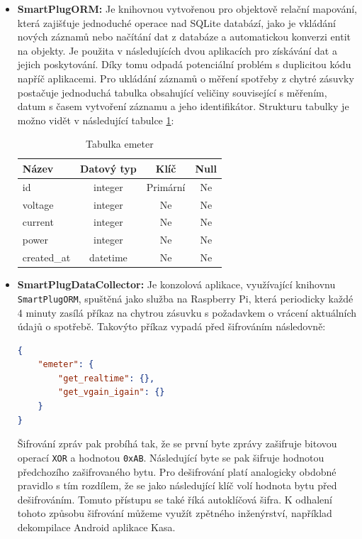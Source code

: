 \documentclass[czech,master,dept460,male,cpp,cpdeclaration,oneside]{diploma}
\begin{document}
\begin{itemize}
\item \textbf{SmartPlugORM:}
Je knihovnou vytvořenou pro objektově relační mapování\autocite{PofEAA}, která zajišťuje jednoduché operace nad SQLite databází, jako je vkládání nových záznamů nebo načítání dat z databáze a automatickou konverzi entit na objekty. Je použita v následujících dvou aplikacích pro získávání dat a jejich poskytování. Díky tomu odpadá potenciální problém s duplicitou kódu napříč aplikacemi. Pro ukládání záznamů o měření spotřeby z chytré zásuvky postačuje jednoduchá tabulka obsahující veličiny související s měřením, datum s časem vytvoření záznamu a jeho identifikátor. Strukturu tabulky je možno vidět v následující tabulce \ref{tab:Table emeter}:

\bigbreak

\begin{table}[ht!]
	\centering
	\begin{tabular}{lccc}
		\hline
		Název & Datový typ & Klíč & Null \\
		\hline
		id & integer & Primární & Ne \\
		voltage & integer & Ne & Ne \\
		current & integer & Ne & Ne \\
		power & integer & Ne & Ne \\
		created_at & datetime & Ne & Ne \\
		\hline
	\end{tabular}
	\caption{Tabulka emeter}
	\label{tab:Table emeter}
\end{table}

\item \textbf{SmartPlugDataCollector:}
Je konzolová aplikace, využívající knihovnu \texttt{SmartPlugORM}, spuštěná jako služba na Raspberry Pi, která periodicky každé 4 minuty zasílá příkaz na chytrou zásuvku s požadavkem o vrácení aktuálních údajů o spotřebě. Takovýto příkaz vypadá před šifrováním následovně:
\bigbreak
\begin{lstlisting}[language=json,caption=TP-Link HS110 příkaz pro získání okamžitých údajů o spotřebě]
{
	"emeter": {
		"get_realtime": {},
		"get_vgain_igain": {}
	}
}
\end{lstlisting}
\bigbreak
\noindent Šifrování zpráv pak probíhá tak, že se první byte zprávy zašifruje bitovou operací \texttt{XOR} a hodnotou \texttt{0xAB}. Následující byte se pak šifruje hodnotou předchozího zašifrovaného bytu. Pro dešifrování platí analogicky obdobné pravidlo s tím rozdílem, že se jako následující klíč volí hodnota bytu před dešifrováním. Tomuto přístupu se také říká autoklíčová šifra. K odhalení tohoto způsobu šifrování můžeme využít zpětného inženýrství, například dekompilace Android aplikace Kasa\autocite{KASA}.


\end{itemize}
\end{document}

